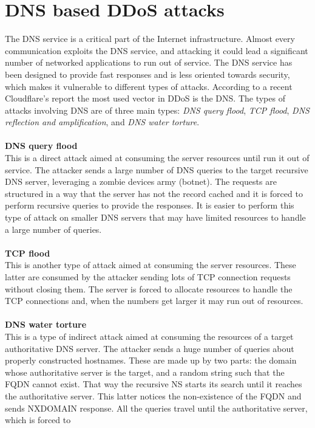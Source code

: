 \section{DNS based DDoS attacks}
The DNS service is a critical part of the Internet infrastructure. Almost every communication exploits the DNS service, and attacking
it could lead a significant number of networked applications to run out of service. The DNS service has been designed to provide fast 
responses and is less oriented towards security, which makes it vulnerable to different types of attacks. According to a recent Cloudflare's
report \cite{DDoSthreatreport} the most used vector in DDoS is the DNS. The types of attacks involving DNS are of three main types: 
\textit{DNS query flood}, \textit{TCP flood}, \textit{DNS reflection and amplification}, and \textit{DNS water torture}.\\
\\
\textbf{DNS query flood}\\
This is a direct attack aimed at consuming the server resources until run it out of service. The attacker sends a large number of DNS queries
to the target recursive DNS server, leveraging a zombie devices army (botnet). The requests are structured in a way that the server has not the
record cached and it is forced to perform recursive queries to provide the responses. It is easier to perform this type of attack on smaller 
DNS servers that may have limited resources to handle a large number of queries.\\
\\
\textbf{TCP flood}\\
This is another type of attack aimed at consuming the server resources. These latter are consumed by the attacker sending lots of TCP 
connection requests without closing them. The server is forced to allocate resources to handle the TCP connections and, when the 
numbers get larger it may run out of resources.\\
\\
\textbf{DNS water torture}\\
This is a type of indirect attack aimed at consuming the resources of a target authoritative DNS server. The attacker sends a huge number
of queries about properly constructed hostnames. These are made up by two parts: the domain whose authoritative server is the target, and
a random string such that the FQDN cannot exist. That way the recursive NS starts its search until it reaches the authoritative server. This latter
notices the non-existence of the FQDN and sends NXDOMAIN response. All the queries travel until the authoritative server, which is forced to
